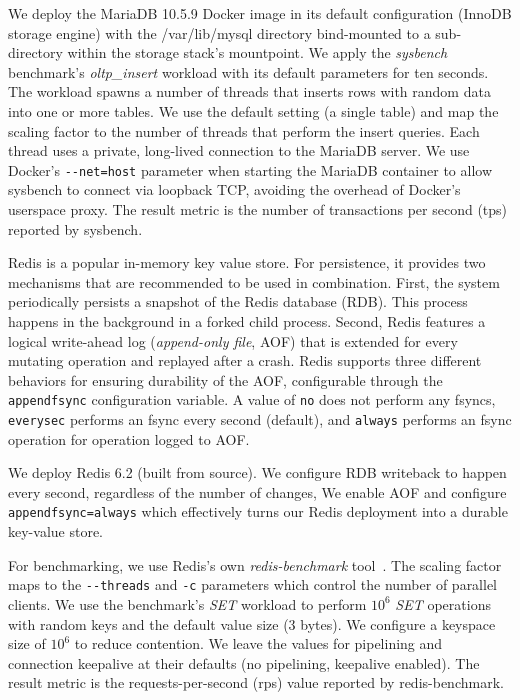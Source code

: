 \documentclass[12pt,a4paper,twoside]{book}
\begin{document}
\begin{description}[noitemsep,leftmargin=1.5cm,labelindent=1cm]
    \item[MariaDB/sysbench] We deploy the MariaDB 10.5.9 Docker image in its default configuration (InnoDB storage engine) with the /var/lib/mysql directory bind-mounted to a sub-directory within the storage stack's mountpoint.
        We apply the \textit{sysbench} benchmark's \textit{oltp\_insert} workload with its default parameters for ten seconds.
        The workload spawns a number of threads that inserts rows with random data into one or more tables.
        We use the default setting (a single table) and map the scaling factor to the number of threads that perform the insert queries.
        Each thread uses a private, long-lived connection to the MariaDB server.
        We use Docker's \lstinline{--net=host} parameter when starting the MariaDB container to allow sysbench to connect via loopback TCP, avoiding the overhead of Docker's userspace proxy.
        The result metric is the number of transactions per second (tps) reported by sysbench.

    \item[Redis-SET] Redis is a popular in-memory key value store.
        For persistence, it provides two mechanisms that are recommended to be used in combination.
        First, the system periodically persists a snapshot of the Redis database (RDB).
        This process happens in the background in a forked child process.
        Second, Redis features a logical write-ahead log (\textit{append-only file}, AOF) that is extended for every mutating operation and replayed after a crash.
        Redis supports three different behaviors for ensuring durability of the AOF, configurable through the \lstinline{appendfsync} configuration variable.
        A value of \lstinline{no} does not perform any fsyncs, \lstinline{everysec} performs an fsync every second (default), and \lstinline{always} performs an fsync operation for operation logged to AOF.
        \cite{RedisPersistenceRedis}

        We deploy Redis 6.2 (built from source).
        We configure RDB writeback to happen every second, regardless of the number of changes,
        We enable AOF and configure \lstinline{appendfsync=always} which effectively turns our Redis deployment into a durable key-value store.

        For benchmarking, we use Redis's own \textit{redis-benchmark} tool~\cite{HowFastRedis}.
        The scaling factor maps to the \lstinline{--threads} and \lstinline{-c} parameters which control the number of parallel clients.
        We use the benchmark's \textit{SET} workload to perform $10^6$ \textit{SET} operations with random keys and the default value size (3 bytes).
        We configure a keyspace size of $10^6$  to reduce contention.
        We leave the values for pipelining and connection keepalive at their defaults (no pipelining, keepalive enabled).
        The result metric is the requests-per-second (rps) value reported by redis-benchmark.


\end{description}
\end{document}
